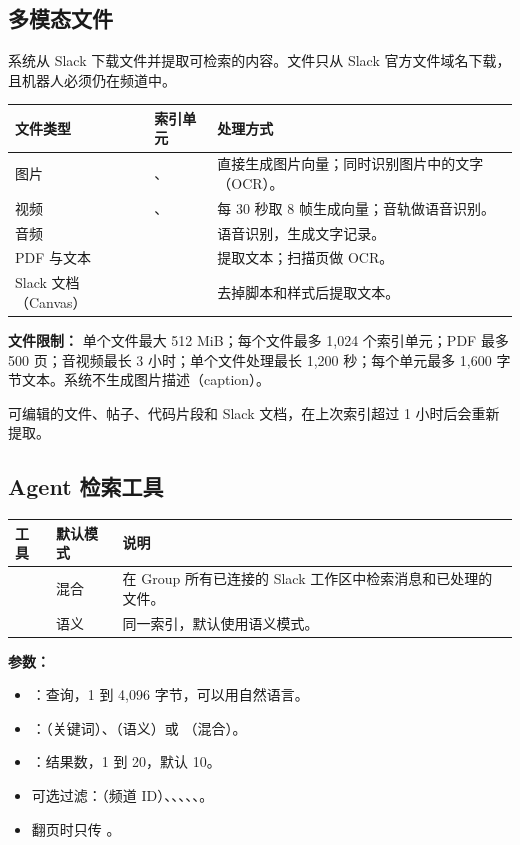 \documentclass[UTF8,a4paper,11pt]{ctexart}
\begin{document}
\subsection{多模态文件}

系统从 Slack 下载文件并提取可检索的内容。文件只从 Slack 官方文件域名下载，且机器人必须仍在频道中。

\begin{longtable}{P{3.4cm}P{3.6cm}P{6.8cm}}
\toprule
文件类型 & 索引单元 & 处理方式 \\
\midrule
\endhead
图片 & 、 & 直接生成图片向量；同时识别图片中的文字（OCR）。 \\
视频 & 、 & 每 30 秒取 8 帧生成向量；音轨做语音识别。 \\
音频 &  & 语音识别，生成文字记录。 \\
PDF 与文本 &  & 提取文本；扫描页做 OCR。 \\
Slack 文档（Canvas） &  & 去掉脚本和样式后提取文本。 \\
\bottomrule
\end{longtable}

\textbf{文件限制：} 单个文件最大 512 MiB；每个文件最多 1,024 个索引单元；PDF 最多 500 页；音视频最长 3 小时；单个文件处理最长 1,200 秒；每个单元最多 1,600 字节文本。系统不生成图片描述（caption）。

可编辑的文件、帖子、代码片段和 Slack 文档，在上次索引超过 1 小时后会重新提取。

\subsection{Agent 检索工具}

\begin{longtable}{P{4.4cm}P{2.0cm}P{7.4cm}}
\toprule
工具 & 默认模式 & 说明 \\
\midrule
\endhead
{} & 混合 & 在 Group 所有已连接的 Slack 工作区中检索消息和已处理的文件。 \\
 & 语义 & 同一索引，默认使用语义模式。 \\
\bottomrule
\end{longtable}

\textbf{参数：}

\begin{itemize}
  \item {}：查询，1 到 4,096 字节，可以用自然语言。
  \item {}：（关键词）、（语义）或 （混合）。
  \item {}：结果数，1 到 20，默认 10。
  \item 可选过滤：（频道 ID）、、、、、。
  \item 翻页时只传 。
\end{itemize}
\end{document}
